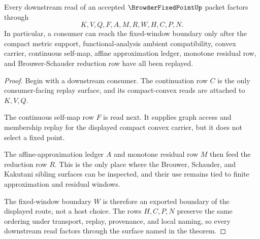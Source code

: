 \begin{theorem}
\label{thm:browder-fixed-point-compact-convex-handoff}
Every downstream read of an accepted $\BrowderFixedPointUp$ packet factors through
$$
K,V,Q,F,A,M,R,W,H,C,P,N .
$$
In particular, a consumer can reach the fixed-window boundary only after the compact metric support, functional-analysis ambient compatibility, convex carrier, continuous self-map, affine approximation ledger, monotone residual row, and Brouwer-Schauder reduction row have all been replayed.
\end{theorem}
\begin{proof}
Begin with a downstream consumer. The continuation row $C$ is the only consumer-facing replay surface, and its compact-convex reads are attached to $K,V,Q$.

The continuous self-map row $F$ is read next. It supplies graph access and membership replay for the displayed compact convex carrier, but it does not select a fixed point.

The affine-approximation ledger $A$ and monotone residual row $M$ then feed the reduction row $R$. This is the only place where the Brouwer, Schauder, and Kakutani sibling surfaces can be inspected, and their use remains tied to finite approximation and residual windows.

The fixed-window boundary $W$ is therefore an exported boundary of the displayed route, not a host choice. The rows $H,C,P,N$ preserve the same ordering under transport, replay, provenance, and local naming, so every downstream read factors through the surface named in the theorem.
\end{proof}



